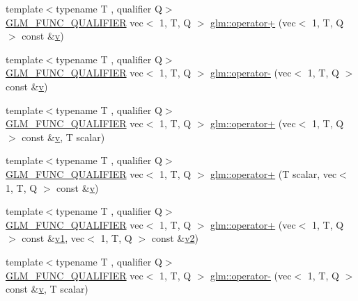 \begin{DoxyCompactItemize}
\item 
{\footnotesize template$<$typename T , qualifier Q$>$ }\\\hyperlink{setup_8hpp_a33fdea6f91c5f834105f7415e2a64407}{G\+L\+M\+\_\+\+F\+U\+N\+C\+\_\+\+Q\+U\+A\+L\+I\+F\+I\+ER} vec$<$ 1, T, Q $>$ \hyperlink{group__ext__vec1_gac2cf4da0dc267f31db88de168ea3169b}{glm\+::operator+} (vec$<$ 1, T, Q $>$ const \&\hyperlink{_s_d_l__opengl_8h_a10a82eabcb59d2fcd74acee063775f90}{v})
\item 
{\footnotesize template$<$typename T , qualifier Q$>$ }\\\hyperlink{setup_8hpp_a33fdea6f91c5f834105f7415e2a64407}{G\+L\+M\+\_\+\+F\+U\+N\+C\+\_\+\+Q\+U\+A\+L\+I\+F\+I\+ER} vec$<$ 1, T, Q $>$ \hyperlink{group__ext__vec1_gad2032db9362999ab1c27aae09816c9fd}{glm\+::operator-\/} (vec$<$ 1, T, Q $>$ const \&\hyperlink{_s_d_l__opengl_8h_a10a82eabcb59d2fcd74acee063775f90}{v})
\item 
{\footnotesize template$<$typename T , qualifier Q$>$ }\\\hyperlink{setup_8hpp_a33fdea6f91c5f834105f7415e2a64407}{G\+L\+M\+\_\+\+F\+U\+N\+C\+\_\+\+Q\+U\+A\+L\+I\+F\+I\+ER} vec$<$ 1, T, Q $>$ \hyperlink{group__ext__vec1_ga00b4b51068bde0730a3ed9ebeb254a24}{glm\+::operator+} (vec$<$ 1, T, Q $>$ const \&\hyperlink{_s_d_l__opengl_8h_a10a82eabcb59d2fcd74acee063775f90}{v}, T scalar)
\item 
{\footnotesize template$<$typename T , qualifier Q$>$ }\\\hyperlink{setup_8hpp_a33fdea6f91c5f834105f7415e2a64407}{G\+L\+M\+\_\+\+F\+U\+N\+C\+\_\+\+Q\+U\+A\+L\+I\+F\+I\+ER} vec$<$ 1, T, Q $>$ \hyperlink{group__ext__vec1_ga9ce1879778cf852a8e5853db26138110}{glm\+::operator+} (T scalar, vec$<$ 1, T, Q $>$ const \&\hyperlink{_s_d_l__opengl_8h_a10a82eabcb59d2fcd74acee063775f90}{v})
\item 
{\footnotesize template$<$typename T , qualifier Q$>$ }\\\hyperlink{setup_8hpp_a33fdea6f91c5f834105f7415e2a64407}{G\+L\+M\+\_\+\+F\+U\+N\+C\+\_\+\+Q\+U\+A\+L\+I\+F\+I\+ER} vec$<$ 1, T, Q $>$ \hyperlink{group__ext__vec1_gadbe612a85d5c9d06f29d726d7998a8db}{glm\+::operator+} (vec$<$ 1, T, Q $>$ const \&\hyperlink{_s_d_l__opengl__glext_8h_a435c176a02c061b43e19bdf7c86cceae}{v1}, vec$<$ 1, T, Q $>$ const \&\hyperlink{_s_d_l__opengl__glext_8h_a0928f6d0f0f794ba000a21dfae422136}{v2})
\item 
{\footnotesize template$<$typename T , qualifier Q$>$ }\\\hyperlink{setup_8hpp_a33fdea6f91c5f834105f7415e2a64407}{G\+L\+M\+\_\+\+F\+U\+N\+C\+\_\+\+Q\+U\+A\+L\+I\+F\+I\+ER} vec$<$ 1, T, Q $>$ \hyperlink{group__ext__vec1_ga8069f3e0f8b424bda71c65bdadaaf73c}{glm\+::operator-\/} (vec$<$ 1, T, Q $>$ const \&\hyperlink{_s_d_l__opengl_8h_a10a82eabcb59d2fcd74acee063775f90}{v}, T scalar)

\end{DoxyCompactItemize}
